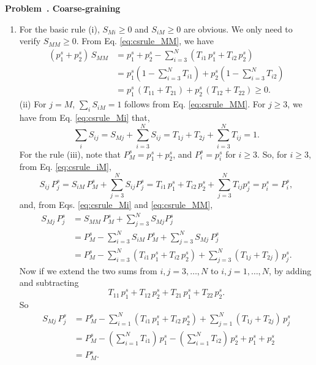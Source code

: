 \documentclass[12pt]{article}
\newcounter{problem}[section]
\newenvironment{problem}[1]
{
  \refstepcounter{problem}\par\bigskip
  \textbf{\large Problem~\theproblem. #1}
  \par\medskip
}
{ \medskip }
\begin{document}
\begin{problem}{Coarse-graining}
\begin{enumerate}
  \item
    For the basic rule (i),
    $S_{Mi} \ge 0$ and $S_{iM} \ge 0$ are obvious.
    We only need to verify $S_{MM} \ge 0$.
    From Eq. \eqref{eq:csrule_MM}, we have
    $$
    \begin{aligned}
    (p^s_1 + p^s_2) \, S_{MM}
    &=
    p^s_1 + p^s_2 - \sum_{i = 3}^N \left( T_{i1} \, p^s_1 + T_{i2} \, p^s_2 \right)
    \\
    &=
    p^s_1 \left( 1 - \sum_{i = 3}^N T_{i1} \right)
    +
    p^s_2 \left( 1 - \sum_{i = 3}^N T_{i2} \right)
    \\
    &=
    p^s_1 \, \left( T_{11} + T_{21} \right)
    +
    p^s_2 \, \left( T_{12} + T_{22} \right)
    \ge 0.
    \end{aligned}
    $$
    (ii) For $j = M$, $\sum_i S_{iM} = 1$ follows from Eq. \eqref{eq:csrule_MM}.
    For $j \ge 3$, we have from Eq. \eqref{eq:csrule_Mi} that,
    $$
    \sum_i S_{ij} = S_{Mj} + \sum_{i = 3}^N S_{ij}
    = T_{1j} + T_{2j} + \sum_{i = 3}^N T_{ij} = 1.
    $$
    For the rule (iii),
    note that $P^s_M = p^s_1 + p^s_2$, and $P^s_i = p^s_i$ for $i \ge 3$.
    So, for $i \ge 3$, from Eq. \eqref{eq:csrule_iM},
    $$
    S_{ij} \, P^s_j
    = S_{iM} \, P^s_M + \sum_{j = 3}^N S_{ij} P^s_j
    = T_{i1} \, p^s_1 + T_{i2} \, p^s_2 + \sum_{j = 3}^N T_{ij} p^s_j
    = p^s_i = P^s_i,
    $$
    and, from Eqs. \eqref{eq:csrule_Mi} and \eqref{eq:csrule_MM},
    $$
    \begin{aligned}
    S_{Mj} \, P^s_j
    &= S_{MM} \, P^s_M + \sum_{j = 3}^N S_{Mj} P^s_j
    \\
    &= P^s_M - \sum_{i = 3}^N S_{iM} \, P^s_M
    + \sum_{j = 3}^N S_{Mj} \, P^s_j
    \\
    &= P^s_M - \sum_{i = 3}^N (T_{i1} \, p^s_1 + T_{i2} \, p^s_2)
    + \sum_{j = 3}^N (T_{1j} + T_{2j}) \, p^s_j
    .
    \end{aligned}
    $$
    Now if we extend the two sums from $i,j = 3, \dots, N$
    to $i, j = 1, \dots, N$, by adding and subtracting
    $$
    T_{11} \, p^s_1 + T_{12} \, p^s_2 + T_{21} \, p^s_1 + T_{22} \, p^s_2
    .
    $$
    So
    $$
    \begin{aligned}
    S_{Mj} \, P^s_j
    &= P^s_M - \sum_{i = 1}^N (T_{i1} \, p^s_1 + T_{i2} \, p^s_2)
    + \sum_{j = 1}^N (T_{1j} + T_{2j}) \, p^s_j
    \\
    &= P^s_M
    - \left( \sum_{i = 1}^N T_{i1} \right) \, p^s_1
    - \left( \sum_{i = 1}^N T_{i2} \right) \, p^s_2
    + p^s_1 + p^s_2
    \\
    &= P^s_M
    .
    \end{aligned}
    $$


\end{enumerate}
\end{problem}
\end{document}
